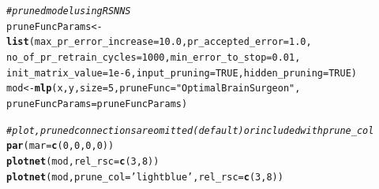 \documentclass[article,shortnames]{jss}\usepackage[]{graphicx}\usepackage[]{color}
\makeatletter
\newcommand{\hlnum}[1]{\textcolor[rgb]{0.686,0.059,0.569}{#1}}%
\newcommand{\hlstr}[1]{\textcolor[rgb]{0.192,0.494,0.8}{#1}}%
\newcommand{\hlcom}[1]{\textcolor[rgb]{0.678,0.584,0.686}{\textit{#1}}}%
\newcommand{\hlstd}[1]{\textcolor[rgb]{0.345,0.345,0.345}{#1}}%
\newcommand{\hlkwb}[1]{\textcolor[rgb]{0.69,0.353,0.396}{#1}}%
\newcommand{\hlkwc}[1]{\textcolor[rgb]{0.333,0.667,0.333}{#1}}%
\newcommand{\hlkwd}[1]{\textcolor[rgb]{0.737,0.353,0.396}{\textbf{#1}}}%
\newenvironment{kframe}{%
 \def\at@end@of@kframe{}%
 \ifinner\ifhmode%
  \def\at@end@of@kframe{\end{minipage}}%
  \begin{minipage}{\columnwidth}%
 \fi\fi%
 \def\FrameCommand##1{\hskip\@totalleftmargin \hskip-\fboxsep
 \colorbox{shadecolor}{##1}\hskip-\fboxsep
     \hskip-\linewidth \hskip-\@totalleftmargin \hskip\columnwidth}%
 \MakeFramed {\advance\hsize-\width
   \@totalleftmargin\z@ \linewidth\hsize
   \@setminipage}}%
 {\par\unskip\endMakeFramed%
 \at@end@of@kframe}
\makeatother
\begin{document}
\begin{kframe}
\begin{alltt}
\hlcom{# pruned model using RSNNS}
\hlstd{pruneFuncParams} \hlkwb{<-} \hlkwd{list}\hlstd{(}\hlkwc{max_pr_error_increase} \hlstd{=} \hlnum{10.0}\hlstd{,} \hlkwc{pr_accepted_error} \hlstd{=} \hlnum{1.0}\hlstd{,}
  \hlkwc{no_of_pr_retrain_cycles} \hlstd{=} \hlnum{1000}\hlstd{,} \hlkwc{min_error_to_stop} \hlstd{=} \hlnum{0.01}\hlstd{,}
  \hlkwc{init_matrix_value} \hlstd{=} \hlnum{1e-6}\hlstd{,} \hlkwc{input_pruning} \hlstd{=} \hlnum{TRUE}\hlstd{,} \hlkwc{hidden_pruning} \hlstd{=} \hlnum{TRUE}\hlstd{)}
\hlstd{mod} \hlkwb{<-} \hlkwd{mlp}\hlstd{(x, y,} \hlkwc{size} \hlstd{=} \hlnum{5}\hlstd{,} \hlkwc{pruneFunc} \hlstd{=} \hlstr{"OptimalBrainSurgeon"}\hlstd{,}
 \hlkwc{pruneFuncParams} \hlstd{= pruneFuncParams)}

\hlcom{# plot, pruned connections are omitted (default) or included with prune_col}
\hlkwd{par}\hlstd{(}\hlkwc{mar} \hlstd{=} \hlkwd{c}\hlstd{(}\hlnum{0}\hlstd{,} \hlnum{0}\hlstd{,} \hlnum{0}\hlstd{,} \hlnum{0}\hlstd{))}
\hlkwd{plotnet}\hlstd{(mod,} \hlkwc{rel_rsc} \hlstd{=} \hlkwd{c}\hlstd{(}\hlnum{3}\hlstd{,} \hlnum{8}\hlstd{))}
\hlkwd{plotnet}\hlstd{(mod,} \hlkwc{prune_col} \hlstd{=} \hlstr{'lightblue'}\hlstd{,} \hlkwc{rel_rsc} \hlstd{=} \hlkwd{c}\hlstd{(}\hlnum{3}\hlstd{,} \hlnum{8}\hlstd{))}
\end{alltt}
\end{kframe}\begin{figure}[!ht]

{\centering {}

}
\end{figure}
\end{document}
